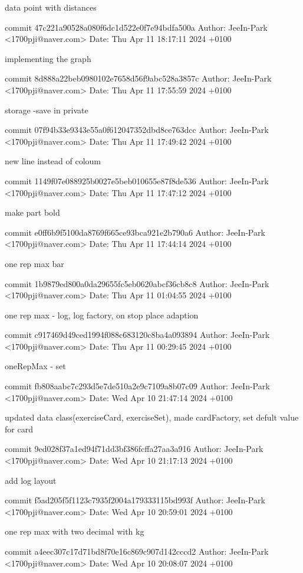     data point with distances

commit 47c221a90528a080f6dc1d522e0f7e94bdfa500a
Author: JeeIn-Park <1700pji@naver.com>
Date:   Thu Apr 11 18:17:11 2024 +0100

    implementing the graph

commit 8d888a22beb0980102e7658d56f9abc528a3857c
Author: JeeIn-Park <1700pji@naver.com>
Date:   Thu Apr 11 17:55:59 2024 +0100

    storage -save in private

commit 07f94b33e9343e55a0f612047352dbd8ce763dcc
Author: JeeIn-Park <1700pji@naver.com>
Date:   Thu Apr 11 17:49:42 2024 +0100

    new line instead of coloum

commit 1149f07e088925b0027e5beb010655e87f8de536
Author: JeeIn-Park <1700pji@naver.com>
Date:   Thu Apr 11 17:47:12 2024 +0100

    make part bold

commit e0ff6b9f5100da8769f665ce93bca921e2b790a6
Author: JeeIn-Park <1700pji@naver.com>
Date:   Thu Apr 11 17:44:14 2024 +0100

    one rep max bar

commit 1b9879ed800a0da29655fc5eb0620abcf36cb8c8
Author: JeeIn-Park <1700pji@naver.com>
Date:   Thu Apr 11 01:04:55 2024 +0100

    one rep max - log, log factory, on stop place adaption

commit c917469d49ced1994f088c683120c8ba4a093894
Author: JeeIn-Park <1700pji@naver.com>
Date:   Thu Apr 11 00:29:45 2024 +0100

    oneRepMax - set

commit fb808aabc7c293d5e7de510a2e9c7109a8b07c09
Author: JeeIn-Park <1700pji@naver.com>
Date:   Wed Apr 10 21:47:14 2024 +0100

    updated data class(exerciseCard, exerciseSet), made cardFactory, set defult value for card

commit 9ed028f37a1ed94f71dd3bf386fcffa27aa3a916
Author: JeeIn-Park <1700pji@naver.com>
Date:   Wed Apr 10 21:17:13 2024 +0100

    add log layout

commit f5ad205f5f1123c7935f2004a179333115bd993f
Author: JeeIn-Park <1700pji@naver.com>
Date:   Wed Apr 10 20:59:01 2024 +0100

    one rep max with two decimal with kg

commit a4eec307c17d71bd8f70e16c869c907d142cccd2
Author: JeeIn-Park <1700pji@naver.com>
Date:   Wed Apr 10 20:08:07 2024 +0100

